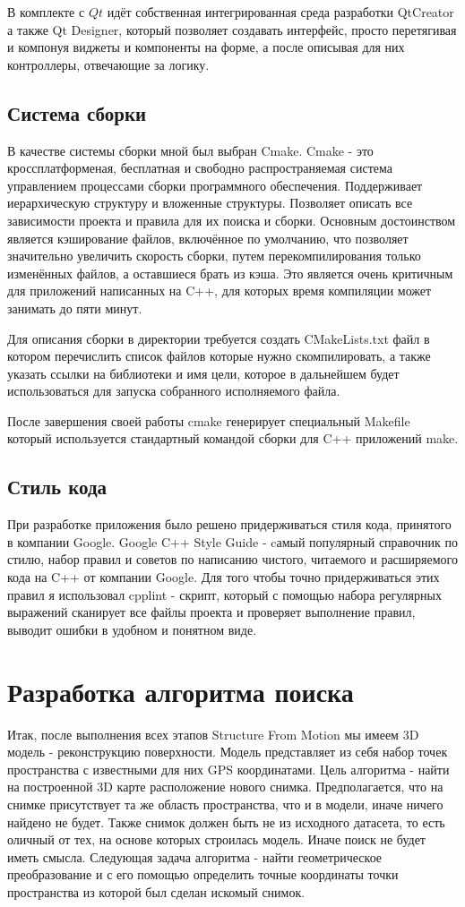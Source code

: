 В комплекте с $Qt$ идёт собственная интегрированная среда разработки QtCreator а также Qt Designer, который позволяет создавать интерфейс, просто перетягивая и компонуя виджеты и компоненты на форме, а после описывая для них контроллеры, отвечающие за логику. 

\subsection{Система сборки}
В качестве системы сборки мной был выбран Cmake. Cmake - это кроссплатформеная, бесплатная и свободно распространяемая система управлением процессами сборки программного обеспечения. Поддерживает иерархическую структуру и вложенные структуры. Позволяет описать все зависимости проекта и правила для их поиска и сборки. Основным достоинством является кэширование файлов, включённое по умолчанию, что позволяет значительно увеличить скорость сборки, путем перекомпилирования только изменённых файлов, а оставшиеся брать из кэша. Это является очень критичным для приложений написанных на C++, для которых время компиляции может занимать до пяти минут.

Для описания сборки в директории требуется создать CMakeLists.txt файл в котором перечислить список файлов которые нужно скомпилировать, а также указать ссылки на библиотеки и имя цели, которое в дальнейшем будет использоваться для запуска собранного исполняемого файла.

После завершения своей работы cmake генерирует специальный Makefile который используется стандартный командой сборки для C++ приложений make.

\subsection{Стиль кода}
При разработке приложения было решено придерживаться стиля кода, принятого в компании Google. Google C++ Style Guide - cамый популярный справочник по стилю, набор правил и советов по написанию чистого, читаемого и расширяемого кода на C++ от компании Google. Для того чтобы точно придерживаться этих правил я использовал cpplint - скрипт, который с помощью набора регулярных выражений сканирует все файлы проекта и проверяет выполнение правил, выводит ошибки в удобном и понятном виде.

\section{Разработка алгоритма поиска}
Итак, после выполнения всех этапов Structure From Motion мы имеем 3D модель - реконструкцию поверхности. Модель представляет из себя набор точек пространства с известными для них GPS координатами. Цель алгоритма - найти на построенной 3D карте расположение нового снимка. Предполагается, что на снимке присутствует та же область пространства, что и в модели, иначе ничего найдено не будет. Также снимок должен быть не из исходного датасета, то есть оличный от тех, на основе которых строилась модель. Иначе поиск не будет иметь смысла. Следующая задача алгоритма - найти геометрическое преобразование и с его помощью определить точные координаты точки пространства из которой был сделан искомый снимок.

